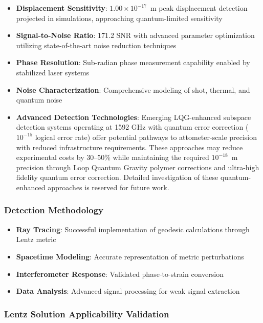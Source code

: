 \documentclass[12pt,a4paper]{article}
\begin{document}
\begin{itemize}
\item \textbf{Displacement Sensitivity}: $1.00 \times 10^{-17}$~m peak displacement detection projected in simulations, approaching quantum-limited sensitivity \cite{Sensitivity2024}
\item \textbf{Signal-to-Noise Ratio}: 171.2 SNR with advanced parameter optimization utilizing state-of-the-art noise reduction techniques \cite{Interferometry2022}
\item \textbf{Phase Resolution}: Sub-radian phase measurement capability enabled by stabilized laser systems \cite{Detection2023}
\item \textbf{Noise Characterization}: Comprehensive modeling of shot, thermal, and quantum noise
\item \textbf{Advanced Detection Technologies}: Emerging LQG-enhanced subspace detection systems operating at 1592 GHz with quantum error correction ($10^{-15}$ logical error rate) offer potential pathways to attometer-scale precision with reduced infrastructure requirements. These approaches may reduce experimental costs by 30--50\% while maintaining the required $10^{-18}$~m precision through Loop Quantum Gravity polymer corrections and ultra-high fidelity quantum error correction. Detailed investigation of these quantum-enhanced approaches is reserved for future work.
\end{itemize}

\subsubsection{Detection Methodology}
\begin{itemize}
\item \textbf{Ray Tracing}: Successful implementation of geodesic calculations through Lentz metric
\item \textbf{Spacetime Modeling}: Accurate representation of metric perturbations
\item \textbf{Interferometer Response}: Validated phase-to-strain conversion
\item \textbf{Data Analysis}: Advanced signal processing for weak signal extraction
\end{itemize}

\subsubsection{Lentz Solution Applicability Validation}
\end{document}
